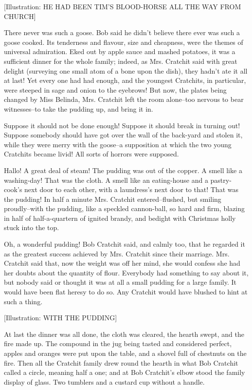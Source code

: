 [Illustration: HE HAD BEEN TIM'S BLOOD-HORSE ALL THE WAY FROM CHURCH]

There never was such a goose. Bob said he didn't believe there ever was
such a goose cooked. Its tenderness and flavour, size and cheapness,
were the themes of universal admiration. Eked out by apple sauce and
mashed potatoes, it was a sufficient dinner for the whole family;
indeed, as Mrs. Cratchit said with great delight (surveying one small
atom of a bone upon the dish), they hadn't ate it all at last! Yet every
one had had enough, and the youngest Cratchits, in particular, were
steeped in sage and onion to the eyebrows! But now, the plates being
changed by Miss Belinda, Mrs. Cratchit left the room alone--too nervous
to bear witnesses--to take the pudding up, and bring it in.

Suppose it should not be done enough! Suppose it should break in turning
out! Suppose somebody should have got over the wall of the back-yard and
stolen it, while they were merry with the goose--a supposition at which
the two young Cratchits became livid! All sorts of horrors were
supposed.

Hallo! A great deal of steam! The pudding was out of the copper. A smell
like a washing-day! That was the cloth. A smell like an eating-house and
a pastry-cook's next door to each other, with a laundress's next door to
that! That was the pudding! In half a minute Mrs. Cratchit
entered--flushed, but smiling proudly--with the pudding, like a speckled
cannon-ball, so hard and firm, blazing in half of half-a-quartern of
ignited brandy, and bedight with Christmas holly stuck into the top.

Oh, a wonderful pudding! Bob Cratchit said, and calmly too, that he
regarded it as the greatest success achieved by Mrs. Cratchit since
their marriage. Mrs. Cratchit said that, now the weight was off her
mind, she would confess she had her doubts about the quantity of flour.
Everybody had something to say about it, but nobody said or thought it
was at all a small pudding for a large family. It would have been flat
heresy to do so. Any Cratchit would have blushed to hint at such a
thing.

[Illustration: WITH THE PUDDING]

At last the dinner was all done, the cloth was cleared, the hearth
swept, and the fire made up. The compound in the jug being tasted and
considered perfect, apples and oranges were put upon the table, and a
shovel full of chestnuts on the fire. Then all the Cratchit family
drew round the hearth in what Bob Cratchit called a circle, meaning half
a one; and at Bob Cratchit's elbow stood the family display of glass.
Two tumblers and a custard cup without a handle.

